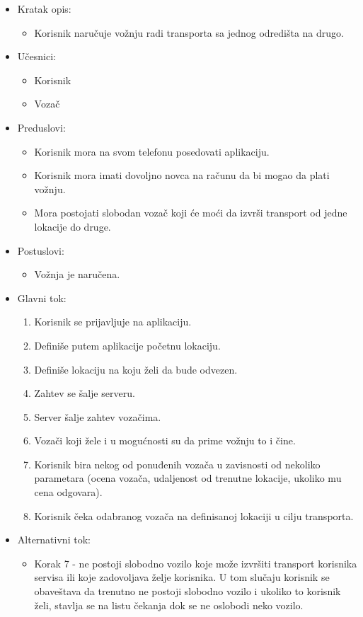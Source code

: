 \begin{itemize}
	\item Kratak opis:
		\begin{itemize}
			\item Korisnik naručuje vožnju radi transporta sa jednog odredišta na drugo.
		\end{itemize}
	\item Učesnici:
		\begin{itemize}
			\item Korisnik
		    \item Vozač
		\end{itemize}				
	\item Preduslovi:
		\begin{itemize}
		    \item Korisnik mora na svom telefonu posedovati aplikaciju.
		    \item Korisnik mora imati dovoljno novca na računu da bi mogao da plati vožnju.
		    \item Mora postojati slobodan vozač koji će moći da izvrši transport od jedne lokacije do druge.
		\end{itemize}
	\item Postuslovi:
		\begin{itemize}
			\item Vožnja je naručena.
		\end{itemize}		
	\item Glavni tok:
		\begin{enumerate}
		    \item Korisnik se prijavljuje na aplikaciju.
		    \item Definiše putem  aplikacije  početnu lokaciju.
		    \item Definiše lokaciju na koju želi da bude odvezen.
		    \item Zahtev se šalje serveru.
		    \item Server šalje zahtev vozačima.
		    \item Vozači koji žele i u mogućnosti su da prime vožnju to i čine.
		    \item Korisnik bira nekog od ponuđenih vozača u zavisnosti od nekoliko parametara (ocena vozača, udaljenost od trenutne lokacije, ukoliko mu cena odgovara).
		    \item Korisnik čeka odabranog vozača na definisanoj lokaciji u cilju transporta. 
		\end{enumerate}
	\item Alternativni tok:
		\begin{itemize}
    		\item Korak 7 - ne postoji slobodno vozilo koje može izvršiti transport korisnika servisa ili koje zadovoljava želje korisnika. U tom slučaju 
		    korisnik se obaveštava da trenutno ne postoji slobodno vozilo i ukoliko to korisnik želi, stavlja se na listu čekanja dok se ne oslobodi neko vozilo.
		\end{itemize}
\end{itemize}


